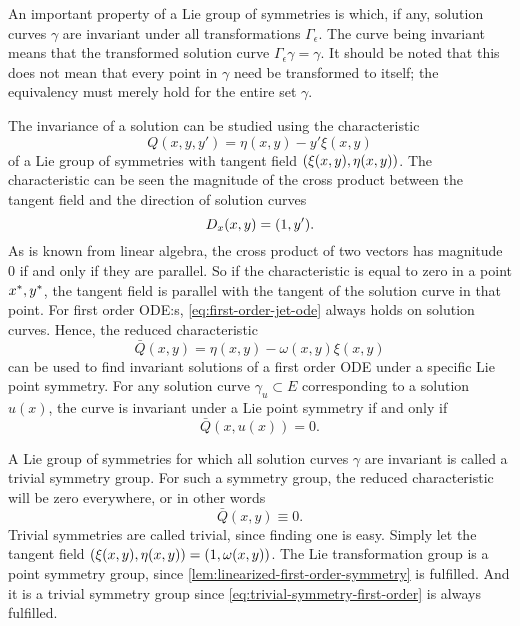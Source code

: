 An important property of a Lie group of symmetries is which, if any, solution curves \(\gamma\) are invariant under all transformations \(\Gamma_\epsilon\).
The curve being invariant means that the transformed solution curve \(\Gamma_\epsilon\gamma = \gamma\).
It should be noted that this does not mean that every point in \(\gamma\) need be transformed to itself; the equivalency must merely hold for the entire set \(\gamma\).

The invariance of a solution can be studied using the characteristic
\begin{equation}
  Q(x, y, y') = \eta(x, y) - y' \xi(x, y)
\end{equation}
of a Lie group of symmetries with tangent field \(\pqty{\xi(x,y), \eta(x,y)}\).
The characteristic can be seen the magnitude of the cross product between the tangent field and the direction of solution curves
\begin{equation}
  D_x \pqty{x, y} = \pqty{1, y'}.
\end{equation}
As is known from linear algebra, the cross product of two vectors has magnitude 0 if and only if they are parallel.
So if the characteristic is equal to zero in a point \(x^*, y^*\), the tangent field is parallel with the tangent of the solution curve in that point.
For first order ODE:s, \cref{eq:first-order-jet-ode} always holds on solution curves.
Hence, the reduced characteristic
\begin{equation}
  \bar{Q}(x, y) = \eta(x, y) - \omega(x, y) \xi(x, y)
\end{equation}
can be used to find invariant solutions of a first order ODE under a specific Lie point symmetry.
For any solution curve \(\gamma_u \subset E\) corresponding to a solution \(u(x)\), the curve is invariant under a Lie point symmetry if and only if
\begin{equation}
  \bar{Q}(x, u(x)) = 0.
\end{equation}

A Lie group of symmetries for which all solution curves \(\gamma\) are invariant is called a trivial symmetry group.
For such a symmetry group, the reduced characteristic will be zero everywhere, or in other words
\begin{equation} \label{eq:trivial-symmetry-first-order}
  \bar{Q}(x, y) \equiv 0.
\end{equation}
Trivial symmetries are called trivial, since finding one is easy.
Simply let the tangent field \(\pqty{\xi(x,y), \eta(x,y)} = \pqty{1, \omega(x,y)}\).
The Lie transformation group is a point symmetry group, since \cref{lem:linearized-first-order-symmetry} is fulfilled.
And it is a trivial symmetry group since \cref{eq:trivial-symmetry-first-order} is always fulfilled.

